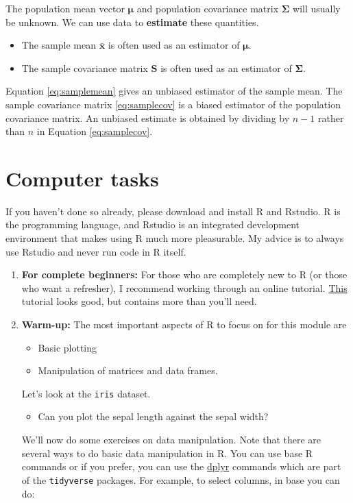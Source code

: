 \documentclass[]{book}
\providecommand{\tightlist}{%
  \setlength{\itemsep}{0pt}\setlength{\parskip}{0pt}}
\theoremstyle{definition}
\theoremstyle{definition}
\theoremstyle{definition}
\theoremstyle{remark}
\begin{document}
The population mean vector \(\boldsymbol \mu\) and population covariance matrix \(\boldsymbol \Sigma\) will usually be unknown. We can use data to \textbf{estimate} these quantities.

\begin{itemize}
\tightlist
\item
  The sample mean \(\bar{\boldsymbol x}\) is often used as an estimator of \(\boldsymbol \mu\).
\item
  The sample covariance matrix \(\boldsymbol S\) is often used as an estimator of \(\boldsymbol \Sigma\).
\end{itemize}

Equation \eqref{eq:samplemean} gives an unbiased estimator of the sample mean. The sample covariance matrix \eqref{eq:samplecov} is a biased estimator of the population covariance matrix. An unbiased estimate is obtained by dividing by \(n-1\) rather than \(n\) in Equation \eqref{eq:samplecov}.

\hypertarget{computer-tasks}{%
\section{Computer tasks}\label{computer-tasks}}

If you haven't done so already, please download and install R and Rstudio. R is the programming language, and Rstudio is an integrated development environment that makes using R much more pleasurable. My advice is to always use Rstudio and never run code in R itself.

\begin{enumerate}
\def\labelenumi{\arabic{enumi}.}
\setcounter{enumi}{-1}
\item
  \textbf{For complete beginners:} For those who are completely new to R (or those who want a refresher), I recommend working through an online tutorial. \href{https://www.statmethods.net/r-tutorial/index.html}{This} tutorial looks good, but contains more than you'll need.
\item
  \textbf{Warm-up:} The most important aspects of R to focus on for this module are

  \begin{itemize}
  \tightlist
  \item
    Basic plotting
  \item
    Manipulation of matrices and data frames.
  \end{itemize}

  Let's look at the \texttt{iris} dataset.

  \begin{itemize}
  \tightlist
  \item
    Can you plot the sepal length against the sepal width?
  \end{itemize}

  We'll now do some exercises on data manipulation. Note that there are several ways to do basic data manipulation in R. You can use base R commands or if you prefer, you can use the \href{https://dplyr.tidyverse.org/}{dplyr} commands which are part of the \texttt{tidyverse} packages.
  For example, to select columns, in base you can do:
\end{enumerate}
\end{document}
